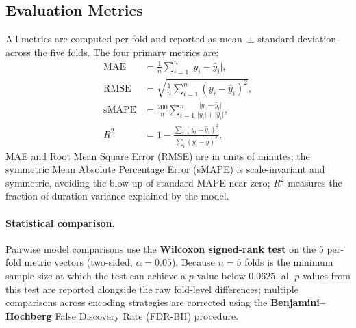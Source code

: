 \subsection{Evaluation Metrics}
\label{sec:eval}

All metrics are computed per fold and reported as mean~$\pm$ standard deviation across the five folds. The four primary metrics are:
\begin{align}
  \mathrm{MAE}   &= \frac{1}{n}\sum_{i=1}^{n}\lvert y_i - \hat{y}_i\rvert,
                 \label{eq:mae}\\[4pt]
  \mathrm{RMSE}  &= \sqrt{\frac{1}{n}\sum_{i=1}^{n}(y_i - \hat{y}_i)^2},
                 \label{eq:rmse}\\[4pt]
  \mathrm{sMAPE} &= \frac{200}{n}\sum_{i=1}^{n}
                    \frac{\lvert y_i - \hat{y}_i\rvert}{\lvert y_i\rvert+\lvert\hat{y}_i\rvert},
                 \label{eq:smape}\\[4pt]
  R^{2}          &= 1 - \frac{\sum_{i}(y_i-\hat{y}_i)^2}{\sum_{i}(y_i-\bar{y})^2}.
                 \label{eq:r2}
\end{align}
MAE and Root Mean Square Error (RMSE) are in units of minutes; the symmetric Mean Absolute Percentage Error (sMAPE) is scale-invariant and symmetric, avoiding the blow-up of standard MAPE near zero; $R^{2}$ measures the fraction of duration variance explained by the model.

\paragraph{Statistical comparison.}
Pairwise model comparisons use the \textbf{Wilcoxon signed-rank test} on the 5 per-fold metric vectors (two-sided, $\alpha = 0.05$). Because $n = 5$ folds is the minimum sample size at which the test can achieve a $p$-value below $0.0625$, all $p$-values from this test are reported alongside the raw fold-level differences; multiple comparisons across encoding strategies are corrected using the \textbf{Benjamini–Hochberg} False Discovery Rate (FDR-BH) procedure.
